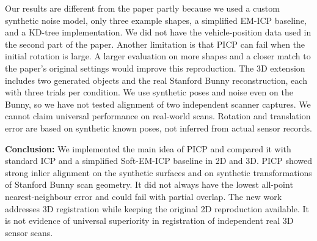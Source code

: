 \documentclass[11pt,a4paper]{article}
\begin{document}
Our results are different from the paper partly because we used a custom
synthetic noise model, only three example shapes, a simplified EM-ICP
baseline, and a KD-tree implementation. We did not have the vehicle-position
data used in the second part of the paper. Another limitation is that PICP
can fail when the initial rotation is large. A larger evaluation on more
shapes and a closer match to the paper's original settings would improve
this reproduction. The 3D extension includes two generated objects and the real Stanford Bunny
reconstruction, each with three trials per condition. We use synthetic poses
and noise even on the Bunny, so we have not tested alignment of two independent
scanner captures. We cannot claim universal performance on real-world scans.
Rotation and translation error are based on synthetic known poses, not
inferred from actual sensor records.

\textbf{Conclusion:} We implemented the main idea of PICP and compared it
with standard ICP and a simplified Soft-EM-ICP baseline in 2D and 3D. PICP
showed strong inlier alignment on the synthetic surfaces and on synthetic
transformations of Stanford Bunny scan geometry. It did not always have the
lowest all-point nearest-neighbour error and could fail with partial overlap. The new work addresses 3D registration while keeping the
original 2D reproduction available. It is not evidence of universal
superiority in registration of independent real 3D sensor scans.
\end{document}
